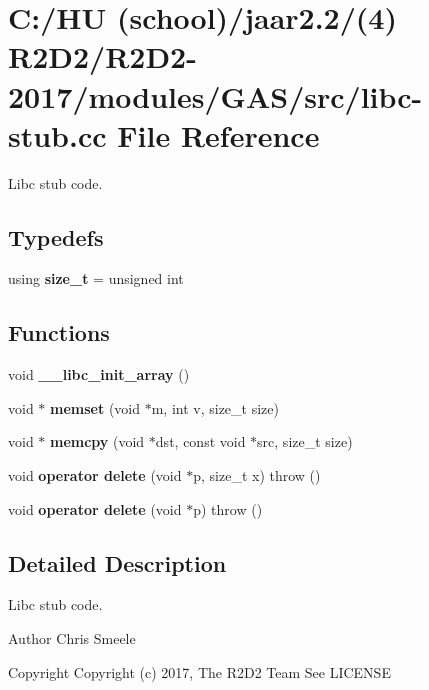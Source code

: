 \hypertarget{libc-stub_8cc}{}\section{C\+:/\+HU (school)/jaar2.2/(4) R2\+D2/\+R2\+D2-\/2017/modules/\+G\+A\+S/src/libc-\/stub.cc File Reference}
\label{libc-stub_8cc}


Libc stub code.  


\subsection*{Typedefs}
\begin{DoxyCompactItemize}
\item 
\mbox{\label{libc-stub_8cc_afadb78ab5a0fd50f0607f9bc7ae0235a}} 
using {\bfseries size\+\_\+t} = unsigned int
\end{DoxyCompactItemize}
\subsection*{Functions}
\begin{DoxyCompactItemize}
\item 
\mbox{\label{libc-stub_8cc_a5227870c8dd60cda7add3fa24aa00a7b}} 
void {\bfseries \+\_\+\+\_\+libc\+\_\+init\+\_\+array} ()
\item 
\mbox{\label{libc-stub_8cc_a9d9bc4578fa6ef77862846c794b3bcc0}} 
void $\ast$ {\bfseries memset} (void $\ast$m, int v, size\+\_\+t size)
\item 
\mbox{\label{libc-stub_8cc_a221995d01087b6da7d0df8d004c7797b}} 
void $\ast$ {\bfseries memcpy} (void $\ast$dst, const void $\ast$src, size\+\_\+t size)
\item 
\mbox{\label{libc-stub_8cc_a6f9d2861931acb9dad897ad7a62eb23f}} 
void {\bfseries operator delete} (void $\ast$p, size\+\_\+t x)  throw ()
\item 
\mbox{\label{libc-stub_8cc_a86107594327f3a001230df9802cd4422}} 
void {\bfseries operator delete} (void $\ast$p)  throw ()
\end{DoxyCompactItemize}


\subsection{Detailed Description}
Libc stub code. 

\begin{DoxyAuthor}{Author}
Chris Smeele 
\end{DoxyAuthor}
\begin{DoxyCopyright}{Copyright}
Copyright (c) 2017, The R2\+D2 Team  See L\+I\+C\+E\+N\+SE 
\end{DoxyCopyright}
